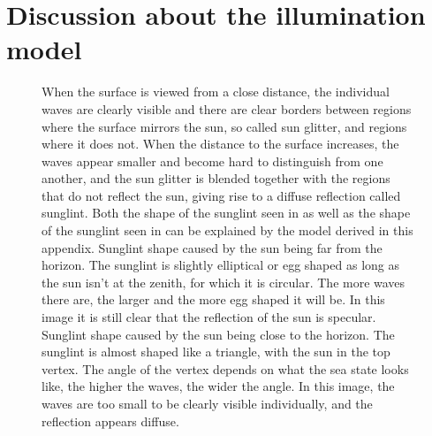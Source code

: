 \section{Discussion about the illumination model}

\begin{figure}
    \centering
    \caption{When the surface is viewed from a close distance, the individual waves are clearly visible and there are clear borders between regions where the surface mirrors the sun, so called sun glitter, and regions where it does not. When the distance to the surface increases, the waves appear smaller and become hard to distinguish from one another, and the sun glitter is blended together with the regions that do not reflect the sun, giving rise to a diffuse reflection called sunglint. Both the shape of the sunglint seen in  as well as the shape of the sunglint seen in  can be explained by the model derived in this appendix.
     Sunglint shape caused by the sun being far from the horizon. The sunglint is slightly elliptical or egg shaped as long as the sun isn't at the zenith, for which it is circular. The more waves there are, the larger and the more egg shaped it will be. In this image it is still clear that the reflection of the sun is specular.
     Sunglint shape caused by the sun being close to the horizon. The sunglint is almost shaped like a triangle, with the sun in the top vertex. The angle of the vertex depends on what the sea state looks like, the higher the waves, the wider the angle. In this image, the waves are too small to be clearly visible individually, and the reflection appears diffuse.
    }
    \label{fig:sea_states}
\end{figure}

